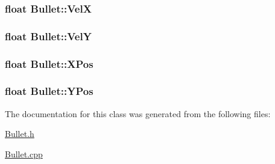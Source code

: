 \hypertarget{classBullet_a4d587ab4f71d1f6d3681507b04674bfb}{
\subsubsection[{Vel\-X}]{\setlength{\rightskip}{0pt plus 5cm}float Bullet\-::\-Vel\-X\hspace{0.3cm}{\ttfamily [private]}}}\label{classBullet_a4d587ab4f71d1f6d3681507b04674bfb}
\hypertarget{classBullet_a567e3c286f1e47015314b7ef141cf8d9}{
\subsubsection[{Vel\-Y}]{\setlength{\rightskip}{0pt plus 5cm}float Bullet\-::\-Vel\-Y\hspace{0.3cm}{\ttfamily [private]}}}\label{classBullet_a567e3c286f1e47015314b7ef141cf8d9}
\hypertarget{classBullet_a0516664a95082588f240ea392bb90e38}{
\subsubsection[{X\-Pos}]{\setlength{\rightskip}{0pt plus 5cm}float Bullet\-::\-X\-Pos\hspace{0.3cm}{\ttfamily [private]}}}\label{classBullet_a0516664a95082588f240ea392bb90e38}
\hypertarget{classBullet_a8f577dfde29bbcfcbdb343c888f391d9}{
\subsubsection[{Y\-Pos}]{\setlength{\rightskip}{0pt plus 5cm}float Bullet\-::\-Y\-Pos\hspace{0.3cm}{\ttfamily [private]}}}\label{classBullet_a8f577dfde29bbcfcbdb343c888f391d9}


The documentation for this class was generated from the following files\-:\begin{DoxyCompactItemize}
\item 
\hyperlink{Bullet_8h}{Bullet.\-h}\item 
\hyperlink{Bullet_8cpp}{Bullet.\-cpp}\end{DoxyCompactItemize}
